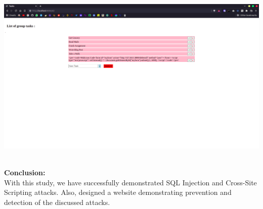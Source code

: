 \documentclass[a4paper, 12pt, fleqn]{article}
\begin{document}
\newpage
\begin{center}
	\vspace{0.1cm}
	\includegraphics[scale=0.25]{xss_prevent}
\end{center}

\noindent
\\
\textbf{Conclusion:} \\
With this study, we have successfully demonstrated SQL Injection and Cross-Site Scripting attacks.
Also, designed a website demonstrating prevention and detection of the discussed attacks. \\
\end{document}
